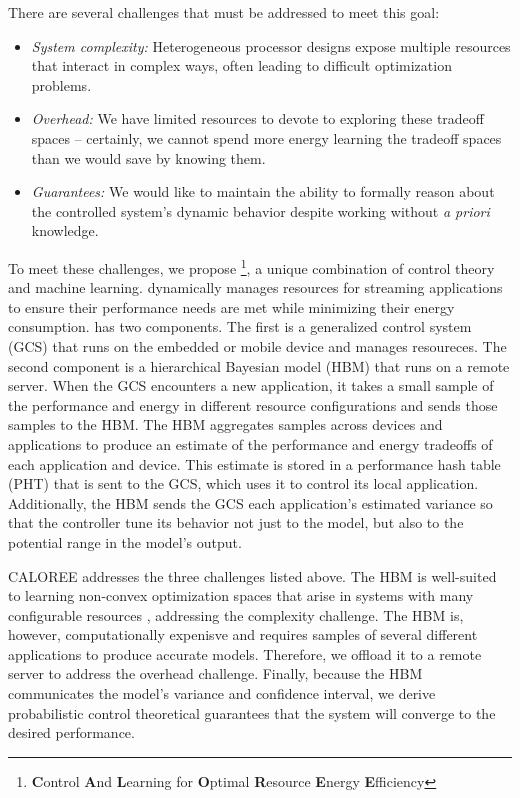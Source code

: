 There are several challenges that must be addressed to meet this goal:
\begin{itemize}
\item \textit{System complexity:} Heterogeneous processor designs
  expose multiple resources that interact in complex ways, often
  leading to difficult optimization problems.
\item \textit{Overhead:} We have limited resources to devote to
  exploring these tradeoff spaces -- certainly, we cannot spend more
  energy learning the tradeoff spaces than we would save by knowing
  them.
\item \textit{Guarantees:} We would like to maintain the ability to
  formally reason about the controlled system's dynamic behavior
  despite working without \emph{a priori} knowledge.
\end{itemize}


To meet these challenges, we propose
\SYSTEM{}\footnote{\textbf{C}ontrol \textbf{A}nd \textbf{L}earning for
  \textbf{O}ptimal \textbf{R}esource \textbf{E}nergy
  \textbf{E}fficiency}, a unique combination of control theory and
machine learning.  \SYSTEM{} dynamically manages resources for
streaming applications to ensure their performance needs are met while
minimizing their energy consumption.  \SYSTEM{} has two components.
The first is a generalized control system (GCS) that runs on the
embedded or mobile device and manages resoureces.  The second
component is a hierarchical Bayesian model (HBM) that runs on a remote
server.  When the GCS encounters a new application, it takes a small
sample of the performance and energy in different resource
configurations and sends those samples to the HBM.  The HBM aggregates
samples across devices and applications to produce an estimate of the
performance and energy tradeoffs of each application and device.  This
estimate is stored in a performance hash table (PHT) that is sent to
the GCS, which uses it to control its local application.
Additionally, the HBM sends the GCS each application's estimated
variance so that the controller tune its behavior not just to the
model, but also to the potential range in the model's output.

CALOREE addresses the three challenges listed above.  The HBM is
well-suited to learning non-convex optimization spaces that arise in
systems with many configurable resources \cite{LEO}, addressing the
complexity challenge.  The HBM is, however, computationally expenisve
and requires samples of several different applications to produce
accurate models.  Therefore, we offload it to a remote server to
address the overhead challenge.  Finally, because the HBM communicates
the model's variance and confidence interval, we derive probabilistic
control theoretical guarantees that the system will converge to the
desired performance.

